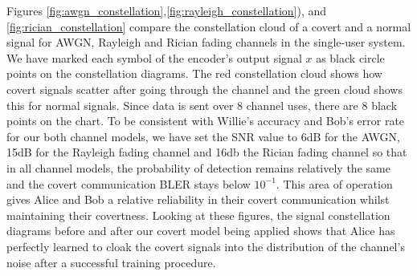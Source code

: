 Figures \ref{fig:awgn_constellation},\ref{fig:rayleigh_constellation}), and \ref{fig:rician_constellation} compare the constellation cloud of a covert and a normal signal for AWGN, Rayleigh and Rician fading channels in the single-user system. We have marked each symbol of the encoder's output signal \(x\) as black circle points on the constellation diagrams. The red constellation cloud shows how covert signals scatter after going through the channel and the green cloud shows this for normal signals. Since data is sent over 8 channel uses, there are 8 black points on the chart. To be consistent with Willie's accuracy and Bob's error rate for our both channel models, we have set the SNR value to 6dB for the AWGN, 15dB for the Rayleigh fading channel and 16db the Rician fading channel so that in all channel models, the probability of detection remains relatively the same and the covert communication BLER stays below \(10^{-1}\). This area of operation gives Alice and Bob a relative reliability in their covert communication whilst maintaining their covertness. Looking at these figures, the signal constellation diagrams before and after our covert model being applied shows that Alice has perfectly learned to cloak the covert signals into the distribution of the channel's noise after a successful training procedure.


